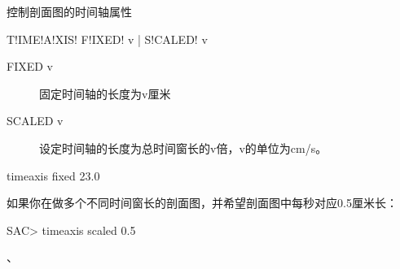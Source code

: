 \label{sss:timeaxis}

控制剖面图的时间轴属性

\begin{SACSTX}
    T!IME!A!XIS! F!IXED! v | S!CALED! v
\end{SACSTX}

\begin{description}
\item [FIXED v] 固定时间轴的长度为v厘米
\item [SCALED v] 设定时间轴的长度为总时间窗长的v倍，v的单位为cm/s。
\end{description}

\begin{SACDFT}
timeaxis fixed 23.0
\end{SACDFT}

如果你在做多个不同时间窗长的剖面图，并希望剖面图中每秒对应0.5厘米长：
\begin{SACCode}
SAC> timeaxis scaled 0.5
\end{SACCode}

、
